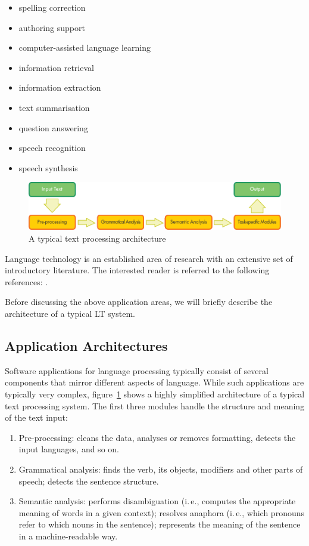 \begin{multicols}{2}
\begin{itemize}
\item spelling correction
\item authoring support
\item computer-assisted language learning
\item information retrieval 
\item information extraction
\item text summarisation
\item question answering
\item speech recognition 
\item speech synthesis 
\end{itemize}

\begin{figure}[b]
  \center
  \includegraphics[width=\textwidth]{../_media/english/text_processing_app_architecture}
  \caption{A typical text processing architecture}
  \label{fig:textprocessingarch_en}
\end{figure}

Language technology is an established area of research with an extensive set of introductory literature. The interested reader is referred to the following references:  \cite{carstensen-etal1, jurafsky-martin01, manning-schuetze1, lt-world1, lt-survey1}.

Before discussing the above application areas, we will briefly describe the architecture of a typical LT system.

\subsection{Application Architectures}

Software applications for language processing typically consist of several components that mirror different aspects of language. While such applications are typically very complex, figure~\ref{fig:textprocessingarch_en} shows a highly simplified architecture of a typical text processing system. The first three modules handle the structure and meaning of the text input:

\begin{enumerate}
\item Pre-processing: cleans the data, analyses or removes formatting, detects the input languages, and so on.
\item Grammatical analysis: finds the verb, its objects, modifiers and other parts of speech; detects the sentence structure.
\item Semantic analysis: performs disambiguation (i.\,e., computes the appropriate meaning of words in a given context); resolves anaphora (i.\,e., which pronouns refer to which nouns in the sentence); represents the meaning of the sentence in a machine-readable way.
\end{enumerate}


\end{multicols}
